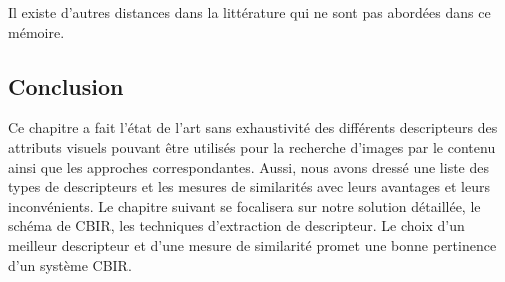 Il existe d’autres distances dans la littérature qui ne sont pas abordées dans ce mémoire.
\subsection{Conclusion}
Ce chapitre a fait l’état de l’art sans exhaustivité des différents descripteurs des attributs visuels pouvant être utilisés pour la recherche d’images par le contenu ainsi que les approches
correspondantes. Aussi, nous avons dressé une liste des types de descripteurs et les mesures de similarités avec leurs avantages et leurs inconvénients. Le chapitre suivant se focalisera sur notre solution détaillée, le schéma de CBIR, les techniques d’extraction de descripteur. Le choix d’un meilleur descripteur et d’une mesure de similarité promet une bonne pertinence d’un système CBIR.